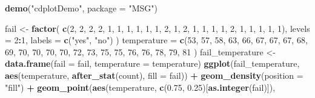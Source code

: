 \documentclass[
  b5paper,
  UTF8,twoside]{book}
\newenvironment{Shaded}{\begin{snugshade}}{\end{snugshade}}
\newcommand{\AttributeTok}[1]{\textcolor[rgb]{0.13,0.29,0.53}{#1}}
\newcommand{\DecValTok}[1]{\textcolor[rgb]{0.00,0.00,0.81}{#1}}
\newcommand{\FloatTok}[1]{\textcolor[rgb]{0.00,0.00,0.81}{#1}}
\newcommand{\FunctionTok}[1]{\textcolor[rgb]{0.13,0.29,0.53}{\textbf{#1}}}
\newcommand{\NormalTok}[1]{#1}
\newcommand{\OtherTok}[1]{\textcolor[rgb]{0.56,0.35,0.01}{#1}}
\newcommand{\SpecialCharTok}[1]{\textcolor[rgb]{0.81,0.36,0.00}{\textbf{#1}}}
\newcommand{\StringTok}[1]{\textcolor[rgb]{0.31,0.60,0.02}{#1}}
\begin{document}
\begin{Shaded}
\begin{Highlighting}[]
\FunctionTok{demo}\NormalTok{(}\StringTok{"cdplotDemo"}\NormalTok{, }\AttributeTok{package =} \StringTok{"MSG"}\NormalTok{)}

\NormalTok{fail }\OtherTok{\textless{}{-}}  \FunctionTok{factor}\NormalTok{(}
  \FunctionTok{c}\NormalTok{(}\DecValTok{2}\NormalTok{, }\DecValTok{2}\NormalTok{, }\DecValTok{2}\NormalTok{, }\DecValTok{2}\NormalTok{, }\DecValTok{1}\NormalTok{, }\DecValTok{1}\NormalTok{, }\DecValTok{1}\NormalTok{, }\DecValTok{1}\NormalTok{, }\DecValTok{1}\NormalTok{, }\DecValTok{1}\NormalTok{, }\DecValTok{2}\NormalTok{, }\DecValTok{1}\NormalTok{,}
    \DecValTok{2}\NormalTok{, }\DecValTok{1}\NormalTok{, }\DecValTok{1}\NormalTok{, }\DecValTok{1}\NormalTok{, }\DecValTok{1}\NormalTok{, }\DecValTok{2}\NormalTok{, }\DecValTok{1}\NormalTok{, }\DecValTok{1}\NormalTok{, }\DecValTok{1}\NormalTok{, }\DecValTok{1}\NormalTok{, }\DecValTok{1}\NormalTok{),}
  \AttributeTok{levels =} \DecValTok{2}\SpecialCharTok{:}\DecValTok{1}\NormalTok{, }
  \AttributeTok{labels =} \FunctionTok{c}\NormalTok{(}\StringTok{"yes"}\NormalTok{, }\StringTok{"no"}\NormalTok{)}
\NormalTok{)}
\NormalTok{temperature }\OtherTok{=} \FunctionTok{c}\NormalTok{(}\DecValTok{53}\NormalTok{, }\DecValTok{57}\NormalTok{, }\DecValTok{58}\NormalTok{, }\DecValTok{63}\NormalTok{, }\DecValTok{66}\NormalTok{, }\DecValTok{67}\NormalTok{, }\DecValTok{67}\NormalTok{, }\DecValTok{67}\NormalTok{, }\DecValTok{68}\NormalTok{, }\DecValTok{69}\NormalTok{, }\DecValTok{70}\NormalTok{,}
  \DecValTok{70}\NormalTok{, }\DecValTok{70}\NormalTok{, }\DecValTok{70}\NormalTok{, }\DecValTok{72}\NormalTok{, }\DecValTok{73}\NormalTok{, }\DecValTok{75}\NormalTok{, }\DecValTok{75}\NormalTok{, }\DecValTok{76}\NormalTok{, }\DecValTok{76}\NormalTok{, }\DecValTok{78}\NormalTok{, }\DecValTok{79}\NormalTok{, }\DecValTok{81}
\NormalTok{)}
\NormalTok{fail\_temperature }\OtherTok{\textless{}{-}} \FunctionTok{data.frame}\NormalTok{(}\AttributeTok{fail =}\NormalTok{ fail, }\AttributeTok{temperature =}\NormalTok{ temperature)}
\FunctionTok{ggplot}\NormalTok{(fail\_temperature, }\FunctionTok{aes}\NormalTok{(temperature, }\FunctionTok{after\_stat}\NormalTok{(count), }\AttributeTok{fill =}\NormalTok{ fail)) }\SpecialCharTok{+}
  \FunctionTok{geom\_density}\NormalTok{(}\AttributeTok{position =} \StringTok{"fill"}\NormalTok{) }\SpecialCharTok{+}
  \FunctionTok{geom\_point}\NormalTok{(}\FunctionTok{aes}\NormalTok{(temperature, }\FunctionTok{c}\NormalTok{(}\FloatTok{0.75}\NormalTok{, }\FloatTok{0.25}\NormalTok{)[}\FunctionTok{as.integer}\NormalTok{(fail)]),}

\end{Highlighting}
\end{Shaded}
\end{document}
